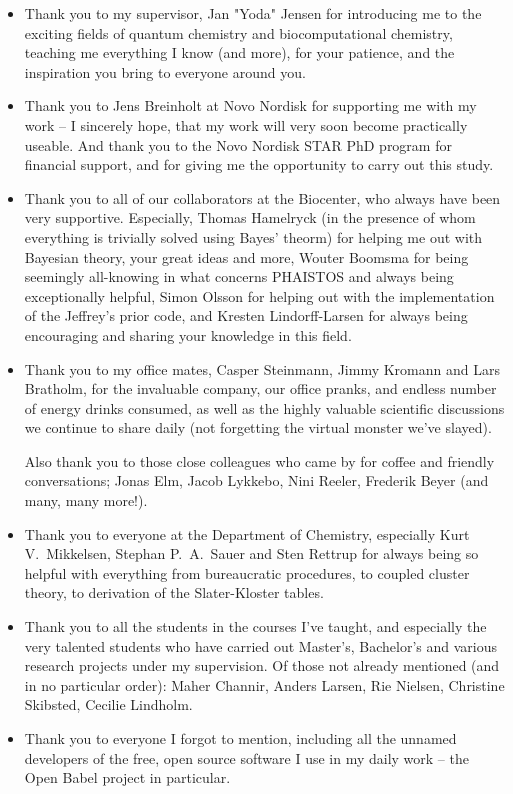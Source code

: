 \begin{itemize}
\item Thank you to my supervisor, Jan "Yoda" Jensen for introducing me to the
    exciting fields of quantum chemistry and biocomputational chemistry, teaching me everything I know (and more), for your patience, and the inspiration you bring to everyone around you.

\item Thank you to Jens Breinholt at Novo Nordisk for supporting me with my work -- I sincerely hope, that my work will very soon become practically useable. And thank you to the Novo Nordisk STAR PhD program for financial support, and for giving me the opportunity to carry out this study.

\item Thank you to all of our collaborators at the Biocenter, who always have been very supportive. Especially, Thomas Hamelryck (in the presence of whom everything is trivially solved using Bayes' theorm) for helping me out with Bayesian theory, your great ideas and more, Wouter Boomsma for being seemingly all-knowing in what concerns PHAISTOS and always being exceptionally helpful, Simon Olsson for helping out with the implementation of the Jeffrey's prior code, and Kresten Lindorff-Larsen for always being encouraging and sharing your knowledge in this field.

\item Thank you to my office mates, Casper Steinmann, Jimmy Kromann and Lars Bratholm, for the invaluable company, our office pranks, and endless number of energy drinks consumed, as well as the highly valuable scientific discussions we continue to share daily (not forgetting the virtual monster we've slayed).

Also thank you to those close colleagues who came by for coffee and friendly conversations; Jonas Elm, Jacob Lykkebo, Nini Reeler, Frederik Beyer (and many, many more!).

\item Thank you to everyone at the Department of Chemistry, especially Kurt V.~Mikkelsen, Stephan P.~A.~Sauer and Sten Rettrup for always being so helpful with everything from bureaucratic procedures, to coupled cluster theory, to derivation of the Slater-Kloster tables.

\item Thank you to all the students in the courses I've taught, and especially the very talented students who have carried out Master's, Bachelor's and various research projects under my supervision. Of those not already mentioned (and in no particular order): Maher Channir, Anders Larsen, Rie Nielsen, Christine Skibsted, Cecilie Lindholm.

\item Thank you to everyone I forgot to mention, including all the unnamed developers of the free, open source software I use in my daily work -- the Open Babel project in particular.

\end{itemize}
